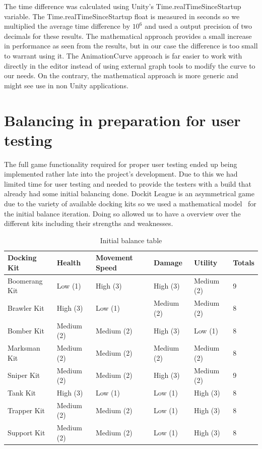 The time difference was calculated using Unity's Time.realTimeSinceStartup variable. The Time.realTimeSinceStartup float is measured in seconds so we multiplied the average time difference by $10^6$ and used a output precision of two decimals for these results. 
The mathematical approach provides a small increase in performance as seen from the results, but in our case the difference is too small to warrant using it. The AnimationCurve approach is far easier to work with directly in the editor instead of using external graph tools to modify the curve to our needs. On the contrary, the mathematical approach is more generic and might see use in non Unity applications.

\section{Balancing in preparation for user testing}
The full game functionality required for proper user testing ended up being implemented rather late into the project's development. Due to this we had limited time for user testing and needed to provide the testers with a build that already had some initial balancing done. 
Dockit League is an asymmetrical game due to the variety of available docking kits so we used a mathematical model~\cite{schell2014art} for the initial balance iteration. Doing so allowed us to have a overview over the different kits including their strengths and weaknesses.

\begin{table}[tbph]
\centering
\caption{Initial balance table}
\label{tab:initBalance}
\begin{tabular}{@{}llllll@{}}
\toprule
\textbf{Docking Kit} & \textbf{Health} & \textbf{Movement Speed} & \textbf{Damage} & \textbf{Utility} & \textbf{Totals} \\ \midrule
Boomerang Kit        & Low (1)         & High (3)                & High (3)        & Medium (2)       & 9               \\
Brawler Kit          & High (3)        & Low (1)                 & Medium (2)      & Medium (2)       & 8               \\
Bomber Kit           & Medium (2)      & Medium (2)              & High (3)        & Low (1)          & 8               \\
Marksman Kit         & Medium (2)      & Medium (2)              & Medium (2)      & Medium (2)       & 8               \\
Sniper Kit           & Medium (2)      & Medium (2)              & High (3)        & Medium (2)       & 9               \\
Tank Kit             & High (3)        & Low (1)                 & Low (1)         & High (3)         & 8               \\
Trapper Kit          & Medium (2)      & Medium (2)              & Low (1)         & High (3)         & 8               \\
Support Kit          & Medium (2)      & Medium (2)              & Low (1)         & High (3)         & 8               \\ \bottomrule
\end{tabular}
\end{table}

